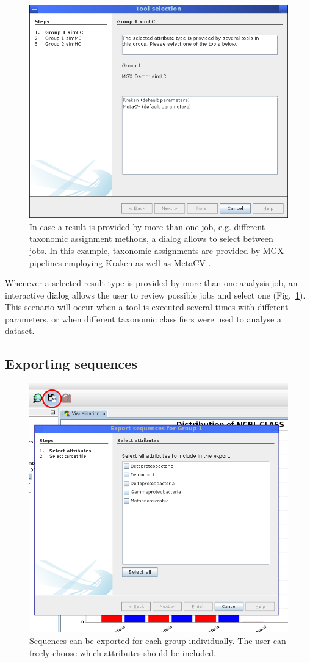 \begin{figure}[H]
\centering
\includegraphics[width=.8\textwidth]{img/mgx/ConflictResolver}
\caption[Job selection]{In case a result is provided by more than one job, e.g. different taxonomic assignment methods,
a dialog allows to select between jobs. In this example, taxonomic assignments are provided by MGX pipelines employing Kraken \cite{KRAKEN}
as well as MetaCV \cite{METACV}.}
\label{viz4}
\end{figure}

\noindent
Whenever a selected result type is provided by more than one analysis job, an interactive dialog allows the user to
review possible jobs and select one (Fig.~\ref{viz4}). This scenario will occur when a tool is executed several 
times with different parameters, or when different taxonomic classifiers were used to analyse a dataset.

\subsection{Exporting sequences}

\begin{figure}[H]
\centering
\includegraphics[width=.8\textwidth]{img/mgx/SeqExport}
\caption[Exporting sequences]{Sequences can be exported for each group individually. The user can freely choose
which attributes should be included.}
\label{seqexp}
\end{figure}

